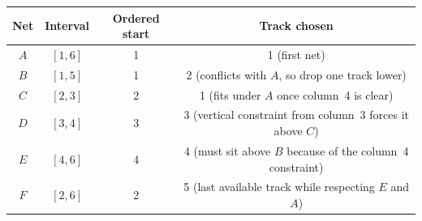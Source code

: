 \documentclass[11pt]{article}
\begin{document}
\begin{center}
  \begin{tabular}{@{}cccc@{}}\toprule
  Net & Interval & Ordered start & Track chosen \\\midrule
  $A$ & $[1,6]$ & 1 & 1 (first net) \\
  $B$ & $[1,5]$ & 1 & 2 (conflicts with $A$, so drop one track lower) \\
  $C$ & $[2,3]$ & 2 & 1 (fits under $A$ once column~4 is clear) \\
  $D$ & $[3,4]$ & 3 & 3 (vertical constraint from column~3 forces it above $C$) \\
  $E$ & $[4,6]$ & 4 & 4 (must sit above $B$ because of the column~4 constraint) \\
  $F$ & $[2,6]$ & 2 & 5 (last available track while respecting $E$ and $A$) \\\bottomrule
  \end{tabular}
\end{center}
\end{document}
